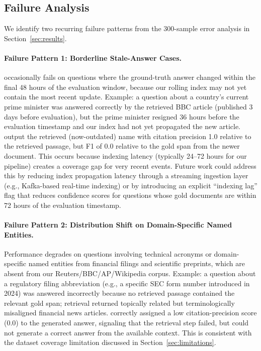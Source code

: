 \subsection{Failure Analysis}

We identify two recurring failure patterns from the 300-sample error analysis in Section~\ref{sec:results}.

\paragraph{Failure Pattern 1: Borderline Stale-Answer Cases.}
\method{} occasionally fails on questions where the ground-truth answer changed within the final 48 hours of the evaluation window, because our rolling index may not yet contain the most recent update. Example: a question about a country's current prime minister was answered correctly by the retrieved BBC article (published 3 days before evaluation), but the prime minister resigned 36 hours before the evaluation timestamp and our index had not yet propagated the new article. \method{} output the retrieved (now-outdated) name with citation precision 1.0 relative to the retrieved passage, but F1 of 0.0 relative to the gold span from the newer document. This occurs because indexing latency (typically 24--72 hours for our pipeline) creates a coverage gap for very recent events. Future work could address this by reducing index propagation latency through a streaming ingestion layer (e.g., Kafka-based real-time indexing) or by introducing an explicit ``indexing lag'' flag that reduces confidence scores for questions whose gold documents are within 72 hours of the evaluation timestamp.

\paragraph{Failure Pattern 2: Distribution Shift on Domain-Specific Named Entities.}
Performance degrades on questions involving technical acronyms or domain-specific named entities from financial filings and scientific preprints, which are absent from our Reuters/BBC/AP/Wikipedia corpus. Example: a question about a regulatory filing abbreviation (e.g., a specific SEC form number introduced in 2024) was answered incorrectly because no retrieved passage contained the relevant gold span; retrieval returned topically related but terminologically misaligned financial news articles. \method{} correctly assigned a low citation-precision score (0.0) to the generated answer, signaling that the retrieval step failed, but could not generate a correct answer from the available context. This is consistent with the dataset coverage limitation discussed in Section~\ref{sec:limitations}.

